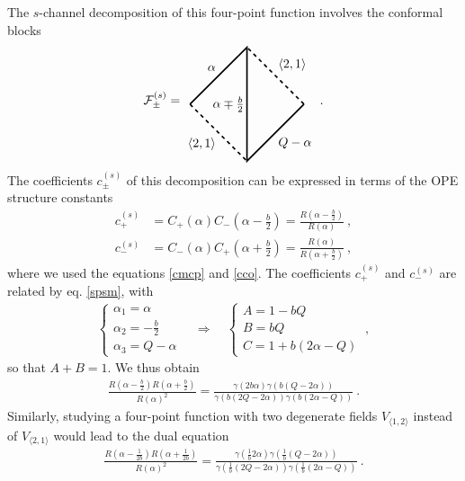 \documentclass[12pt, a4paper, notitlepage, twoside]{report}
\numberwithin{equation}{section}
\theoremstyle{break}
\begin{document}
The $s$-channel decomposition of this four-point function involves the conformal blocks
 \begin{align}
\mathcal{F}^{(s)}_\pm = 
\begin{tikzpicture}[baseline=(current  bounding  box.center), very thick, scale = .8]
\draw[dashed] (2, 0) -- node [above right] {\!$\langle 2,1 \rangle$} (0, 2);
\draw[dashed] (-2, 0)
-- node [below left] {$\langle 2,1 \rangle$\!} (0, -2); 
\draw (-2, 0) -- node [above left] {$\alpha$\!} (0, 2) 
-- node [left] {$\alpha\mp \frac{b}{2}\!  $} (0, -2)
-- node [below right] {\!$Q-\alpha$} (2, 0);
\end{tikzpicture}
\ .
\end{align}
The coefficients $c^{(s)}_\pm$ of this decomposition can be expressed in terms of the OPE structure constants
\begin{align}
 c^{(s)}_+ &= C_+(\alpha)C_-(\alpha-\tfrac{b}{2}) = \frac{R(\alpha-\tfrac{b}{2})}{R(\alpha)}\ ,
\\
c^{(s)}_- & = C_-(\alpha)C_+(\alpha+\tfrac{b}{2}) = \frac{R(\alpha)}{R(\alpha+\tfrac{b}{2})}\ ,
\end{align}
where we used the equations \eqref{cmcp} and \eqref{cco}.
The coefficients $c^{(s)}_+$ and $c^{(s)}_-$ are related by eq. \eqref{spsm}, with
\begin{align}
 \left\{\begin{array}{l}  \alpha_1 = \alpha \\ \alpha_2 = -\frac{b}{2} \\ \alpha_3 = Q-\alpha \end{array}\right. \quad \Rightarrow \quad \left\{\begin{array}{l}  A = 1-bQ \\ B = bQ \\ C=1+b(2\alpha-Q) \end{array}\right.  \ ,
\end{align}
so that $A+B=1$. We thus obtain
\begin{align}
 \frac{R(\alpha-\frac{b}{2})R(\alpha+\frac{b}{2})}{R(\alpha)^2} 
 = \frac{\gamma(2b\alpha)\gamma(b(Q-2\alpha))}{\gamma(b(2Q-2\alpha))\gamma(b(2\alpha-Q))}\ .
\end{align}
Similarly, studying a four-point function with two degenerate fields $V_{\langle 1,2 \rangle}$ instead of $V_{\langle 2,1 \rangle}$ would lead to the dual equation
\begin{align}
 \frac{R(\alpha-\tfrac{1}{2b})R(\alpha+\tfrac{1}{2b})}{R(\alpha)^2} 
 = \frac{\gamma(\frac{1}{b}2\alpha)\gamma(\frac{1}{b}(Q-2\alpha))}{\gamma(\frac{1}{b}(2Q-2\alpha))\gamma(\frac{1}{b}(2\alpha-Q))}\ .
\end{align}
\end{document}
